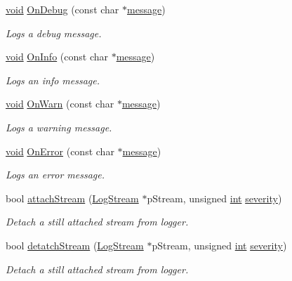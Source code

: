 \begin{DoxyCompactItemize}
\item 
\hyperlink{_s_d_l__opengl_8h_a3db05964a3cc4410f35b7ea2b7eb850d}{void} \hyperlink{class_assimp_1_1_null_logger_af354ebbd382b7097a55d364794a45631}{On\-Debug} (const char $\ast$\hyperlink{_g_l_e_w_2glew_8h_ab5d4c2bfcb78f279c688575297d42f74}{message})
\begin{DoxyCompactList}\small\item\em Logs a debug message. \end{DoxyCompactList}\item 
\hyperlink{_s_d_l__opengl_8h_a3db05964a3cc4410f35b7ea2b7eb850d}{void} \hyperlink{class_assimp_1_1_null_logger_a12d2b0048d17a819c8c00277ad1394c5}{On\-Info} (const char $\ast$\hyperlink{_g_l_e_w_2glew_8h_ab5d4c2bfcb78f279c688575297d42f74}{message})
\begin{DoxyCompactList}\small\item\em Logs an info message. \end{DoxyCompactList}\item 
\hyperlink{_s_d_l__opengl_8h_a3db05964a3cc4410f35b7ea2b7eb850d}{void} \hyperlink{class_assimp_1_1_null_logger_a9a04c2b9e3d4bc9eec8f693ed8115f24}{On\-Warn} (const char $\ast$\hyperlink{_g_l_e_w_2glew_8h_ab5d4c2bfcb78f279c688575297d42f74}{message})
\begin{DoxyCompactList}\small\item\em Logs a warning message. \end{DoxyCompactList}\item 
\hyperlink{_s_d_l__opengl_8h_a3db05964a3cc4410f35b7ea2b7eb850d}{void} \hyperlink{class_assimp_1_1_null_logger_a4fbf66103757fafcff891fb04b4ee714}{On\-Error} (const char $\ast$\hyperlink{_g_l_e_w_2glew_8h_ab5d4c2bfcb78f279c688575297d42f74}{message})
\begin{DoxyCompactList}\small\item\em Logs an error message. \end{DoxyCompactList}\item 
bool \hyperlink{class_assimp_1_1_null_logger_a31c05ecaee392b5fd34fd2dfd1cca559}{attach\-Stream} (\hyperlink{class_assimp_1_1_log_stream}{Log\-Stream} $\ast$p\-Stream, unsigned \hyperlink{_s_d_l__thread_8h_a6a64f9be4433e4de6e2f2f548cf3c08e}{int} \hyperlink{_g_l_e_w_2glew_8h_aa9ef9fc6186ec914a859436da4764bca}{severity})
\begin{DoxyCompactList}\small\item\em Detach a still attached stream from logger. \end{DoxyCompactList}\item 
bool \hyperlink{class_assimp_1_1_null_logger_ab49b14a0045aab73b813a448b5aa77b4}{detatch\-Stream} (\hyperlink{class_assimp_1_1_log_stream}{Log\-Stream} $\ast$p\-Stream, unsigned \hyperlink{_s_d_l__thread_8h_a6a64f9be4433e4de6e2f2f548cf3c08e}{int} \hyperlink{_g_l_e_w_2glew_8h_aa9ef9fc6186ec914a859436da4764bca}{severity})
\begin{DoxyCompactList}\small\item\em Detach a still attached stream from logger. \end{DoxyCompactList}\end{DoxyCompactItemize}
